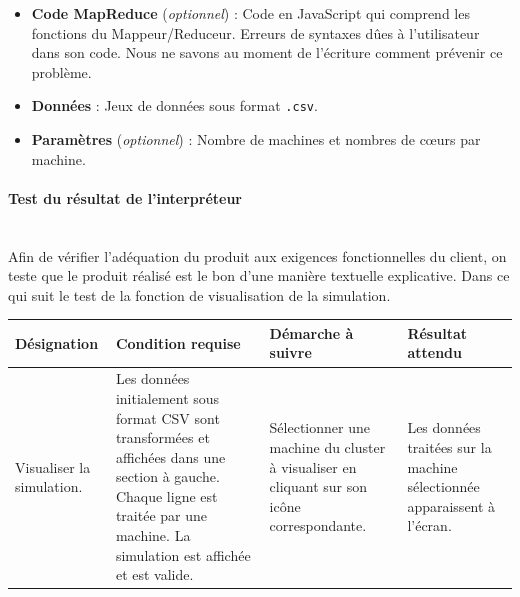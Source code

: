 \documentclass[12pt,a4paper]{article}
\begin{document}

\vspace{10pt}
\begin{itemize}
\item \textbf{Code MapReduce} (\emph{optionnel}) : Code en JavaScript qui comprend les fonctions du Mappeur/Reduceur. Erreurs de syntaxes dûes à l'utilisateur dans son code. Nous ne savons au moment de l'écriture comment prévenir ce problème.

\item \textbf{Données} : Jeux de données sous format \texttt{.csv}.

\item \textbf{Paramètres} (\emph{optionnel}) : Nombre de machines et nombres de cœurs par machine.
\end{itemize}

\paragraph{Test du résultat de l'interpréteur} ~\\
Afin de vérifier l'adéquation du produit aux exigences fonctionnelles du client, on teste que le produit réalisé est le bon d'une manière textuelle explicative.
Dans ce qui suit le test de la fonction de visualisation de la simulation.
\vspace{11pt}

\begin{tabularx}{\textwidth}{|X|X|X|X|}
  \hline
  Désignation & Condition requise & Démarche à suivre & Résultat attendu\\
  \hline 
  Visualiser la simulation. & Les données initialement sous format CSV sont transformées et affichées dans une section à gauche. Chaque ligne est traitée par une machine. La simulation est affichée et est valide.& Sélectionner une machine du cluster à visualiser en cliquant sur son icône correspondante. & Les données traitées sur la machine sélectionnée apparaissent à l'écran.\\
  \hline
\end{tabularx}
\newpage
\end{document}
